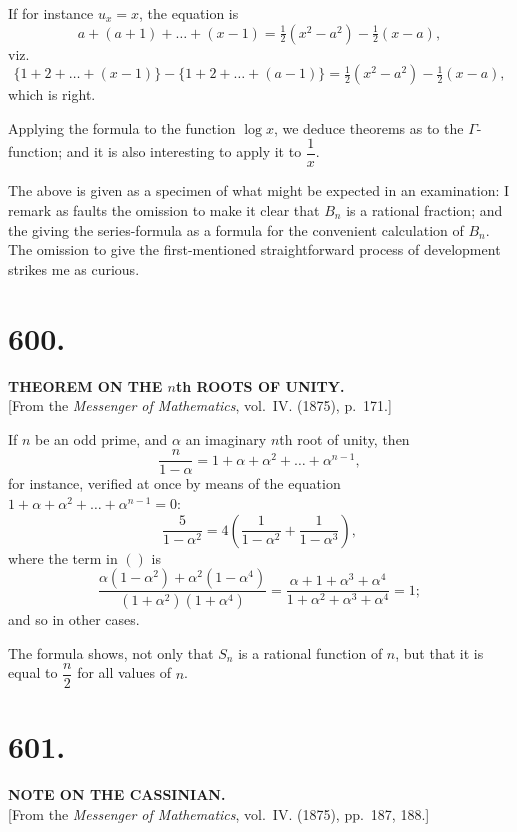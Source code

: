 \documentclass[11pt,a4paper]{book}
\begin{document}
If for instance $u_x=x$, the equation is
\[
a+(a+1)+\ldots+(x-1) = \tfrac{1}{2}(x^2-a^2) - \tfrac{1}{2}(x-a),
\]
viz.
\[
\{1+2+\ldots+(x-1)\} - \{1+2+\ldots+(a-1)\}
= \tfrac{1}{2}(x^2-a^2) - \tfrac{1}{2}(x-a),
\]
which is right.

Applying the formula to the function $\log x$, we deduce theorems as to the
$\Gamma$-function; and it is also interesting to apply it to $\dfrac{1}{x}$.

The above is given as a specimen of what might be expected in an
examination: I remark as faults the omission to make it clear that $B_n$ is
a rational fraction; and the giving the series-formula as a formula for the
convenient calculation of $B_n$. The omission to give the first-mentioned
straightforward process of development strikes me as curious.

\newpage
\section*{600.}
\begin{center}
{\large\bfseries THEOREM ON THE $n$th ROOTS OF UNITY.}\\[0.5em]
[From the \textit{Messenger of Mathematics}, vol.~IV. (1875), p.~171.]
\end{center}

If $n$ be an odd prime, and $\alpha$ an imaginary $n$th root of unity, then
\[
\frac{n}{1-\alpha} = 1 + \alpha + \alpha^2 + \ldots + \alpha^{n-1},
\]
for instance, verified at once by means of the equation
$1+\alpha+\alpha^2+\ldots+\alpha^{n-1}=0$:
\[
\frac{5}{1-\alpha^2} = 4\left(\frac{1}{1-\alpha^2} + \frac{1}{1-\alpha^3}\right),
\]
where the term in $()$ is
\[
\frac{\alpha(1-\alpha^2)+\alpha^2(1-\alpha^4)}{(1+\alpha^2)(1+\alpha^4)}
= \frac{\alpha+1+\alpha^3+\alpha^4}{1+\alpha^2+\alpha^3+\alpha^4} = 1;
\]
and so in other cases.

The formula shows, not only that $S_n$ is a rational function of $n$, but
that it is equal to $\dfrac{n}{2}$ for all values of $n$.

\newpage
\section*{601.}
\begin{center}
{\large\bfseries NOTE ON THE CASSINIAN.}\\[0.5em]
[From the \textit{Messenger of Mathematics}, vol.~IV. (1875), pp.~187, 188.]
\end{center}
\end{document}
